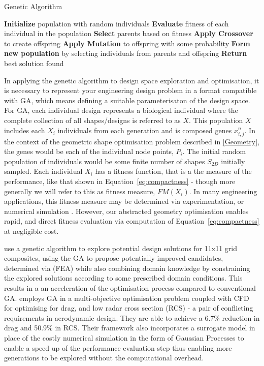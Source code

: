 \documentclass{article}
\begin{document}
\begin{algorithm}
\caption{Genetic Algorithm}
\begin{algorithmic}[1]
\label{alg:GA}
\STATE \textbf{Initialize} population with random individuals
    \STATE \textbf{Evaluate} fitness of each individual in the population
    \STATE \textbf{Select} parents based on fitness
    \STATE \textbf{Apply Crossover} to create offspring
    \STATE \textbf{Apply Mutation} to offspring with some probability
    \STATE \textbf{Form new population} by selecting individuals from parents and offspring
\ENDWHILE
\STATE \textbf{Return} best solution found
\end{algorithmic}
\end{algorithm}


In applying the genetic algorithm to design space exploration and optimisation, it is necessary to represent your engineering design problem in a format compatible with GA, which means defining a suitable parameterisaton of the design space. For GA, each individual design represents a biological individual where the complete collection of all shapes/designs is referred to as $X$. This population $X$ includes each $X_i$ individuals from each generation and is composed genes $x^n_{i,j}$. In the context of the geometric shape optimisation problem described in \ref{Geometry}, the genes would be each of the individual node points, $P_i$. The initial random population of individuals would be some finite number of shapes $S_{2D}$ initially sampled. Each individual $X_i$ has a fitness function, that is a the measure of the performance, like that shown in Equation~\eqref{eq:compactness} - though more generally we will refer to this as fitness measure, $FM(X_i)$. In many engineering applications, this fitness measure may be determined via experimentation, or numerical simulation \citep{Pimentel2022}. However, our abstracted geometry optimisation enables rapid, and direct fitness evaluation via computation of Equation~\ref{eq:compactness} at negligible cost.

\cite{Kim2021} use a genetic algorithm to explore potential design solutions for 11x11 grid composites, using the GA to propose potentially improved candidates, determined via (FEA) while also combining domain knowledge by constraining the explored solutions according to some prescribed domain conditions. This results in a an acceleration of the optimisation process compared to conventional GA. \cite{Taj2023} employs GA in a multi-objective optimisation problem coupled with CFD for optimising for drag, and low radar cross section (RCS) -  a pair of conflicting requirements in aerodynamic design. They are able to achieve a  6.7\% reduction in drag and 50.9\% in RCS. Their framework also incorporates a surrogate model in place of the costly numerical simulation in the form of Gaussian Processes to enable a speed up of the performance evaluation step thus enabling more generations to be explored without the computational overhead.
\end{document}
